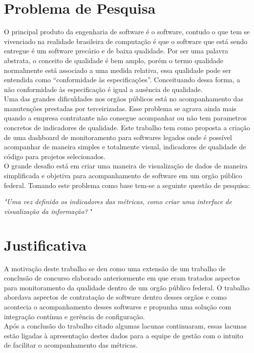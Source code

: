\section{Problema de Pesquisa}
	O principal produto da engenharia de software é o software, contudo o que tem se vivenciado na realidade brasileira de computação é que o software que está sendo entregue é um software precário e de baixa qualidade. Por ser uma palavra abstrata, o conceito de qualidade é bem amplo, porém o termo qualidade normalmente está associado a uma medida relativa, essa qualidade pode ser entendida como “conformidade às especificações”. Conceituando dessa forma, a não conformidade às especificação é igual a ausência de qualidade.
	\\Uma das grandes dificuldades nos orgãos públicos está no acompanhamento das manutenções prestadas por terceirizadas. Esse problema se agrava ainda mais quando a empresa contratante não consegue acompanhar ou não tem parametros concretos de indicadores de qualidade. Este trabalho tem como proposta a criação de uma dashboard de monitoramento para softwares legados onde é possível acompanhar de maneira simples e totalmente visual, indicadores de qualidade de código para projetos selecionados.
	\\O grande desafio está em criar uma maneira de visualização de dados de maneira simplificada e objetiva para acompanhamento de software em um orgão público federal. Tomando este problema como base tem-se a seguinte questão de pesquisa:
	
	\begin{center}
	\textit{"Uma vez definido os indicadores das métricas, como criar uma interface de visualização da informação? }"	
	\end{center}
	
\section{Justificativa}
	A motivação deste trabalho se deu como uma extensão de um trabalho de conclusão de concurso elaborado anteriormente em que eram tratados aspectos para monitoramento da qualidade dentro de um orgão público federal. O trabalho abordava aspectos de contratação de software dentro desses orgãos e como acontecia o acompanhamento desses softwares e propunha uma solução com integração contínua e gerência de configuração.
	\\Após a conclusão do trabalho citado algumas lacunas continuaram, essas lacunas estão ligadas à apresentação destes dados para a equipe de gestão com o intuito de facilitar o acompanhamento das métricas.


